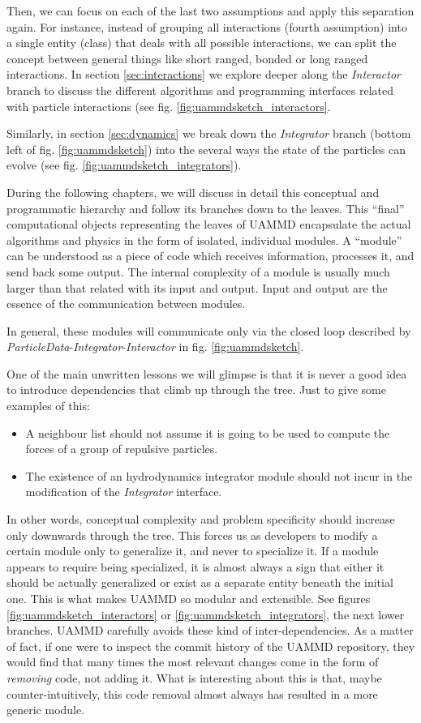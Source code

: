 \documentclass[ twoside,openright,titlepage,numbers=noenddot,%
headinclude,footinclude,cleardoublepage=empty,abstract=on,
BCOR=5mm,paper=a4,fontsize=11pt, dvipsnames
]{scrreprt}
\newcommand{\uammd}{\gls{UAMMD}\xspace}
\begin{document}
Then, we can focus on each of the last two assumptions and apply this separation again. For instance, instead of grouping all interactions (fourth assumption) into a single entity (class) that deals with all possible interactions, we can split the concept between general things like short ranged, bonded or long ranged interactions. In section \ref{sec:interactions} we explore deeper along the \emph{Interactor} branch to discuss the different algorithms and programming interfaces related with particle interactions (see fig. \ref{fig:uammdsketch_interactors}.

Similarly, in section \ref{sec:dynamics} we break down the \emph{Integrator} branch (bottom left of fig. \ref{fig:uammdsketch}) into the several ways the state of the particles can evolve (see fig. \ref{fig:uammdsketch_integrators}).

During the following chapters, we will discuss in detail this conceptual and programmatic hierarchy and follow its branches down to the leaves. This ``final'' computational objects representing the leaves of \uammd encapsulate the actual algorithms and physics in the form of isolated, individual modules. A ``module'' can be understood as a piece of code which receives information, processes it, and send back some output. The internal complexity of a module is usually much larger than that related with its input and output. Input and output are the essence of the communication between modules.

In general, these modules will communicate only via the closed loop described by \emph{ParticleData}-\emph{Integrator}-\emph{Interactor} in fig. \ref{fig:uammdsketch}.

One of the main unwritten lessons we will glimpse is that it is never a good idea to introduce dependencies that climb up through the tree. Just to give some examples of this:
\begin{itemize}
\item A neighbour list should not assume it is going to be used to
  compute the forces of a group of repulsive particles.
\item The existence
  of an hydrodynamics integrator module should not incur in the
  modification of the \emph{Integrator} interface.
\end{itemize}
In other words, conceptual complexity and problem specificity should increase only downwards through the tree. This forces us as developers to modify a certain module only to generalize it, and never to specialize it. If a module appears to require being specialized, it is almost always a sign that either it should be actually generalized or exist as a separate entity beneath the initial one. This is what makes \uammd so modular and extensible. See figures \ref{fig:uammdsketch_interactors} or \ref{fig:uammdsketch_integrators}, the next lower branches.
\uammd carefully avoids these kind of inter-dependencies. As a matter of fact, if one were to inspect the commit history of the \uammd repository, they would find that many times the most relevant changes come in the form of \emph{removing} code, not adding it. What is interesting about this is that, maybe counter-intuitively, this code removal almost always has resulted in a more generic module.
\end{document}
